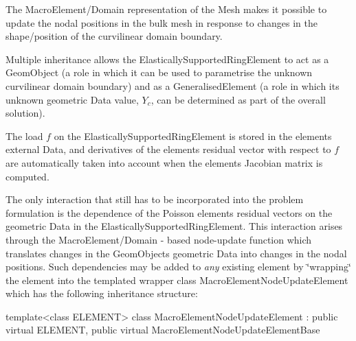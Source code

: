 \begin{DoxyItemize}
\item The {\ttfamily Macro\+Element/\+Domain} representation of the Mesh makes it possible to update the nodal positions in the bulk mesh in response to changes in the shape/position of the curvilinear domain boundary.
\item Multiple inheritance allows the {\ttfamily Elastically\+Supported\+Ring\+Element} to act as a {\ttfamily Geom\+Object} (a role in which it can be used to parametrise the unknown curvilinear domain boundary) and as a {\ttfamily Generalised\+Element} (a role in which its unknown geometric {\ttfamily Data} value, $ Y_c $, can be determined as part of the overall solution).
\item The load $ f $ on the {\ttfamily Elastically\+Supported\+Ring\+Element} is stored in the element\textquotesingle{}s external {\ttfamily Data}, and derivatives of the element\textquotesingle{}s residual vector with respect to $ f $ are automatically taken into account when the element\textquotesingle{}s Jacobian matrix is computed.
\end{DoxyItemize}The only interaction that still has to be incorporated into the problem formulation is the dependence of the Poisson element\textquotesingle{}s residual vectors on the geometric {\ttfamily Data} in the {\ttfamily Elastically\+Supported\+Ring\+Element}. This interaction arises through the {\ttfamily Macro\+Element/\+Domain} -\/ based node-\/update function which translates changes in the {\ttfamily Geom\+Object\textquotesingle{}s} geometric {\ttfamily Data} into changes in the nodal positions. Such dependencies may be added to {\itshape any} existing element by \char`\"{}wrapping\char`\"{} the element into the templated wrapper class {\ttfamily Macro\+Element\+Node\+Update\+Element} which has the following inheritance structure\+:


\begin{DoxyCode}
\textcolor{keyword}{template}<\textcolor{keyword}{class} ELEMENT>
\textcolor{keyword}{class }MacroElementNodeUpdateElement : \textcolor{keyword}{public} \textcolor{keyword}{virtual} ELEMENT, 
                                      \textcolor{keyword}{public} \textcolor{keyword}{virtual} MacroElementNodeUpdateElementBase
\end{DoxyCode}


